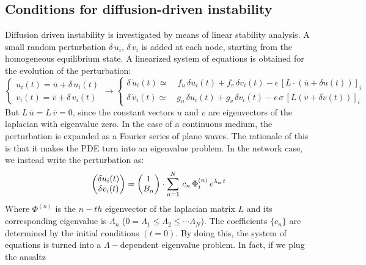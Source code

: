 \subsection{Conditions for diffusion-driven instability}
Diffusion driven instability is investigated by means of linear stability analysis. A small random perturbation $\delta\,u_i,\, \delta\,v_i$ is added at each node, starting from the homogeneous equilibrium state. A linearized system of equations is obtained for the evolution of the perturbation:
\begin{equation}
    \begin{cases}
    u_i(t) = \overline{u} + \delta\, u_i(t)\\
    v_i(t) = \overline{v} + \delta\, v_i(t)
    \end{cases}
    \rightarrow 
    \begin{cases}
    \delta\, \dot{u}_i(t) \simeq \quad     f_u\, \delta u_i(t) +  f_v\, \delta v_i(t) - \epsilon\,[L\cdot (\overline{u}+ \delta u(t))]_i\\
    \delta\, \dot{v}_i(t) \simeq \quad 
    g_u \, \delta u_i(t) +  g_v \, \delta v_i(t) - \epsilon\,\sigma\,[L(\overline{v}+ \delta v(t))]_i
    \end{cases}
\end{equation}
But $L\,\overline{u} = L\,\overline{v} = 0$, since the constant vectors $u$ and $v$ are eigenvectors of the laplacian with eigenvalue zero.
In the case of a continuous medium, the perturbation is expanded as a Fourier series of plane waves. The rationale of this is that it makes the PDE turn into an eigenvalue problem.
In the network case, we instead write the perturbation as:
\begin{equation*}
    \begin{pmatrix}
    \delta u_i (t) \\
    \delta v_i (t) \\
    \end{pmatrix}
    =
    \begin{pmatrix}
        1 \\
        B_n \\
    \end{pmatrix}
    \cdot \sum_{n=1}^{N}\, c_n\,\Phi_i^{(n)}\, e^{\lambda_n\,t} \\
\end{equation*}
Where $\Phi^{(n)}$ is the $n-th$ eigenvector of the laplacian matrix $L$ and its corresponding eigenvalue is $\Lambda_n$ ($0=\Lambda_1 \leq \Lambda_2 \leq \cdots \Lambda_N$). The coefficients $\{c_n\}$ are determined by the initial conditions $(t=0)$. By doing this, the system of equations is turned into a $\Lambda -$dependent eigenvalue problem. In fact, if we plug the ansaltz 
